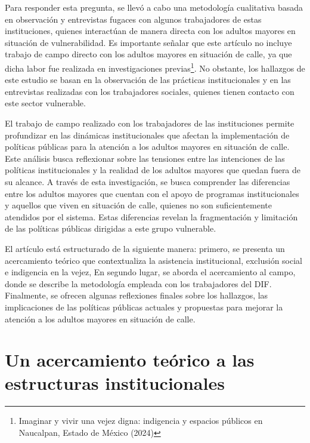 \documentclass[
  spanish,
  11pt,
  a4paper,
]{scrbook}
\begin{document}
Para responder esta pregunta, se llevó a cabo una metodología
cualitativa basada en observación y entrevistas fugaces con algunos
trabajadores de estas instituciones, quienes interactúan de manera
directa con los adultos mayores en situación de vulnerabilidad. Es
importante señalar que este artículo no incluye trabajo de campo directo
con los adultos mayores en situación de calle, ya que dicha labor fue
realizada en investigaciones previas\footnote{Imaginar y vivir una vejez
  digna: indigencia y espacios públicos en Naucalpan, Estado de México
  (2024)}. No obstante, los hallazgos de este estudio se basan en la
observación de las prácticas institucionales y en las entrevistas
realizadas con los trabajadores sociales, quienes tienen contacto con
este sector vulnerable.

El trabajo de campo realizado con los trabajadores de las instituciones
permite profundizar en las dinámicas institucionales que afectan la
implementación de políticas públicas para la atención a los adultos
mayores en situación de calle. Este análisis busca reflexionar sobre las
tensiones entre las intenciones de las políticas institucionales y la
realidad de los adultos mayores que quedan fuera de su alcance. A través
de esta investigación, se busca comprender las diferencias entre los
adultos mayores que cuentan con el apoyo de programas institucionales y
aquellos que viven en situación de calle, quienes no son suficientemente
atendidos por el sistema. Estas diferencias revelan la fragmentación y
limitación de las políticas públicas dirigidas a este grupo vulnerable.

El artículo está estructurado de la siguiente manera: primero, se
presenta un acercamiento teórico que contextualiza la asistencia
institucional, exclusión social e indigencia en la vejez, En segundo
lugar, se aborda el acercamiento al campo, donde se describe la
metodología empleada con los trabajadores del DIF. Finalmente, se
ofrecen algunas reflexiones finales sobre los hallazgos, las
implicaciones de las políticas públicas actuales y propuestas para
mejorar la atención a los adultos mayores en situación de calle.

\section*{Un acercamiento teórico a las estructuras
institucionales}\label{un-acercamiento-teuxf3rico-a-las-estructuras-institucionales}

\end{document}
